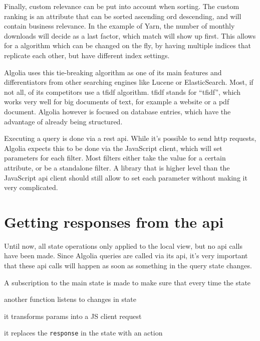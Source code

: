 Finally, custom relevance can be put into account when sorting. The custom ranking is an attribute that can be sorted ascending ord descending, and will contain business relevance. In the example of Yarn, the number of monthly downloads will decide as a last factor, which match will show up first. This allows for a algorithm which can be changed on the fly, by having multiple indices that replicate each other, but have different index settings.

Algolia uses this tie-breaking algorithm as one of its main features and differentiators from other searching engines like Lucene or ElasticSearch. Most, if not all, of its competitors use a \acrshort{tfidf} algorithm. \acrshort{tfidf} stands for ``\acrlong{tfidf}'', which works very well for big documents of text, for example a website or a pdf document. Algolia however is focused on database entries, which have the advantage of already being structured.

Executing a query is done via a \acrshort{rest} \acrshort{api}. While it's possible to send http requests, Algolia expects this to be done via the JavaScript client, which will set parameters for each filter. Most filters either take the value for a certain \gls{attribute}, or be a standalone filter. A library that is higher level than the JavaScript \acrshort{api} client should still allow to set each parameter without making it very complicated.




\section{Getting responses from the \acrshort{api}} %
\label{sec:getting_responses_from_the_api}

Until now, all state operations only applied to the local view, but no \acrshort{api} calls have been made. Since Algolia queries are called via its \acrshort{api}, it's very important that these \acrshort{api} calls will happen as soon as something in the query state changes. 

A subscription to the main state is made to make sure that every time the state

another function listens to changes in state %

it transforms params into a JS client request

it replaces the {\tt response} in the state with an action

